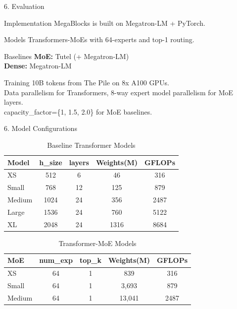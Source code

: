 \documentclass[11pt]{beamer}
\begin{document}
\begin{frame}{6. Evaluation}
    \begin{block}{Implementation}
    \scriptsize
    MegaBlocks is built on Megatron-LM + PyTorch.
    \end{block}
    
    \begin{block}{Models}
    \scriptsize
    Transformers-MoEs with 64-experts and top-1 routing.
    \end{block}
    
    \begin{block}{Baselines}
    \scriptsize
    \textbf{MoE:} Tutel (+ Megatron-LM) \\
    \textbf{Dense:} Megatron-LM
    \end{block}
    
    \begin{block}{Training}
    \scriptsize
    10B tokens from The Pile on 8x A100 GPUs. \\
    Data parallelism for Transformers, 8-way expert model parallelism for MoE layers. \\
    capacity\_factor=\{1, 1.5, 2.0\} for MoE baselines.
    \end{block}
\end{frame}

\begin{frame}{6. Model Configurations}
    \begin{table}
    \scriptsize
    \centering
    \caption{Baseline Transformer Models}
    \vspace{-0.1cm}
    \begin{tabular}{lcccc}
    \hline
    \textbf{Model} & \textbf{h\_size} & \textbf{layers} & \textbf{Weights(M)} & \textbf{GFLOPs} \\
    \hline
    XS & 512 & 6 & 46 & 316 \\
    Small & 768 & 12 & 125 & 879 \\
    Medium & 1024 & 24 & 356 & 2487 \\
    Large & 1536 & 24 & 760 & 5122 \\
    XL & 2048 & 24 & 1316 & 8684 \\
    \hline
    \end{tabular}
    \end{table}
    
    \vspace{0.3cm}
    
    \begin{table}
    \scriptsize
    \centering
    \caption{Transformer-MoE Models}
    \vspace{-0.1cm}
    \begin{tabular}{lcccc}
    \hline
    \textbf{MoE} & \textbf{num\_exp} & \textbf{top\_k} & \textbf{Weights(M)} & \textbf{GFLOPs} \\
    \hline
    XS & 64 & 1 & 839 & 316 \\
    Small & 64 & 1 & 3,693 & 879 \\
    Medium & 64 & 1 & 13,041 & 2487 \\
    \hline
    \end{tabular}
    \end{table}
\end{frame}
\end{document}
